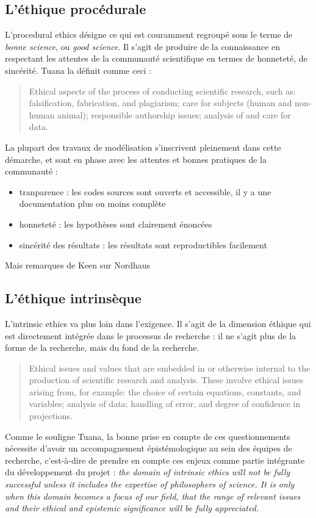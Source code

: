 \subsection{L'éthique procédurale}

L'\Gls{procedural ethics} désigne ce qui est couramment regroupé sous le terme de \textit{bonne science}, ou \textit{good science}. Il s'agit de produire de la connaissance en respectant les attentes de la communauté scientifique en termes de honneteté, de sincérité. Tuana \cite{tuana_leading_2010}  la définit comme ceci : 

\begin{quote}
Ethical aspects of the process of conducting scientific research, such as: falsification, fabrication, and plagiarism; care for subjects (human and non-human animal); responsible authorship issues; analysis of and care for data.
\end{quote}
La plupart des travaux de modélisation s'inscrivent pleinement dans cette démarche, et sont en phase avec les attentes et bonnes pratiques de la communauté : 

\begin{itemize}
    \item tranparence : les codes sources sont ouverts et accessible, il y a une documentation plus ou moins complète
    \item honneteté : les hypothèses sont clairement énoncées
    \item sincérité des résultats : les résultats sont reproductibles facilement
\end{itemize}

\begin{tcolorbox}
    Mais remarques de Keen sur Nordhaus
\end{tcolorbox}

\subsection{L'éthique intrinsèque}

L'\Gls{intrinsic ethics} va plus loin dans l'exigence. Il s'agit de la dimension éthique qui est directement intégrée dans le processus de recherche : il ne s'agit plus de la forme de la recherche, mais du fond de la recherche. 

\begin{quote}
Ethical issues and values that are embedded in or otherwise internal to the production of scientific research and analysis. These involve ethical issues arising from, for example: the choice of certain equations, constants, and variables; analysis of data; handling of error, and degree of confidence in projections.
\end{quote}
Comme le souligne Tuana, la bonne prise en compte de ces questionnements nécessite d'avoir un accompagnement épistémologique au sein des équipes de recherche, c'est-à-dire de prendre en compte ces enjeux comme partie intégrante du développement du projet : \emph{the domain of intrinsic ethics will not be fully successful unless it includes the expertise of philosophers of science. It is only when this domain becomes a focus of our field, that the range of relevant issues and their ethical and epistemic significance will be fully appreciated.} 

